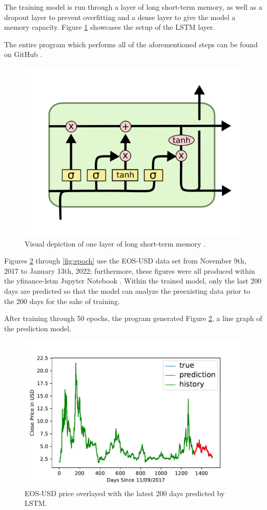 The training model is run through a layer of long short-term memory,
as well as a dropout layer to prevent overfitting and a dense layer to
give the model a memory capacity. Figure \ref{fig:alstm} showcases the
setup of the LSTM layer.

The entire program which performs all of the aforementioned steps can
be found on GitHub \cite{c13}.

\begin{figure}[htb]
\includegraphics[width=0.5\columnwidth]{images/lstm.png}
\caption{Visual depiction of one layer of long short-term memory \cite{c9}.}
\label{fig:alstm}
\end{figure}

Figures \ref{fig:prediction-model} through \ref{fig:epoch} use the
EOS-USD data set from November 9th, 2017 to January 13th, 2022;
furthermore, these figures were all produced within the yfinance-lstm
Jupyter Notebook \cite{c13}. Within the trained model, only the last
200 days are predicted so that the model can analyze the preexisting
data prior to the 200 days for the sake of training.

After training through 50 epochs, the program generated Figure
\ref{fig:prediction-model}, a line graph of the prediction model.

\begin{figure}[htb]
\includegraphics[width=\columnwidth]{images/EOS-USD-prediction-model.pdf}
\caption{EOS-USD price overlayed with the latest 200 days predicted by LSTM.}
\label{fig:prediction-model}
\end{figure}

